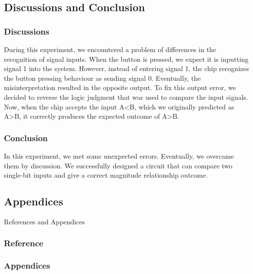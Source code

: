 \subsection{Discussions and Conclusion}
    \subsubsection{Discussions}%
    During this experiment, we encountered a problem of differences in the 
    recognition of signal inputs. When the button is pressed, 
    we expect it is inputting signal 1 into the system. 
    However, instead of entering signal 1, the chip recognizes the button 
    pressing behaviour as sending signal 0. Eventually, the misinterpretation 
    resulted in the opposite output. 
    To fix this output error, we decided to reverse the logic judgment 
    that was used to compare the input signals. 
    Now, when the chip accepts the input A<B, which we originally predicted 
    as A>B, it correctly produces the expected outcome of A>B. 

    \subsubsection{Conclusion}
    In this experiment, we met some unexpected errors. Eventually, we overcame them by discussion. We successfully designed a circuit that can compare two single-bit inputs and give a correct magnitude relationship outcome.
\subsection{Appendices} References and Appendices
    \subsubsection{Reference}%
    \subsubsection{Appendices}%